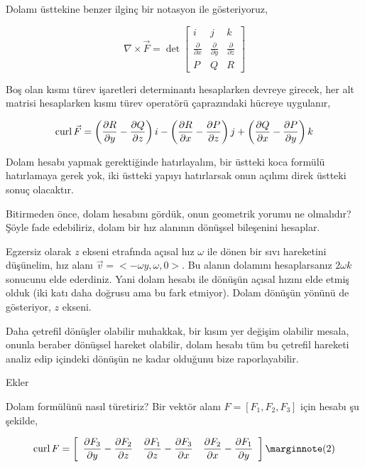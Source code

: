 \documentclass[12pt,fleqn]{article}\usepackage{../../common}
\begin{document}
Dolamı üsttekine benzer ilginç bir notasyon ile gösteriyoruz,

$$
\nabla \times \vec{F} =
\det
\left[\begin{array}{ccc}
i & j & k \\
\frac{\partial }{\partial x} & \frac{\partial }{\partial y} & \frac{\partial }{\partial z} \\
P & Q & R
\end{array}\right]
$$

Boş olan kısmı türev işaretleri determinantı hesaplarken devreye girecek, her
alt matrisi hesaplarken kısmı türev operatörü çaprazındaki hücreye uygulanır,

$$
\operatorname{curl} \vec{F} =
  \left(\frac{\partial R}{\partial y} - \frac{\partial Q}{\partial z}\right) i -
  \left(\frac{\partial R}{\partial x} - \frac{\partial P}{\partial z}\right) j +
  \left(\frac{\partial Q}{\partial x} - \frac{\partial P}{\partial y}\right) k   
$$

Dolam hesabı yapmak gerektiğinde hatırlayalım, bir üstteki koca formülü
hatırlamaya gerek yok, iki üstteki yapıyı hatırlarsak onun açılımı direk
üstteki sonuç olacaktır.

Bitirmeden önce, dolam hesabını gördük, onun geometrik yorumu ne olmalıdır?
Şöyle fade edebiliriz, dolam bir hız alanının dönüşsel bileşenini hesaplar.

Egzersiz olarak $z$ ekseni etrafında açısal hız $\omega$ ile dönen bir sıvı
hareketini düşünelim, hız alanı $\vec{v} = < -\omega y, \omega, 0 > $.  Bu
alanın dolamını hesaplarsanız $2 \omega k$ sonucunu elde ederdiniz.  Yani dolam
hesabı ile dönüşün açısal hızını elde etmiş olduk (iki katı daha doğrusu ama bu
fark etmiyor). Dolam dönüşün yönünü de gösteriyor, $z$ ekseni.

Daha çetrefil dönüşler olabilir muhakkak, bir kısım yer değişim olabilir mesala,
onunla beraber dönüşsel hareket olabilir, dolam hesabı tüm bu çetrefil hareketi
analiz edip içindeki dönüşün ne kadar olduğunu bize raporlayabilir.

Ekler

Dolam formülünü nasıl türetiriz? Bir vektör alanı $F = [F_1,F_2,F_3]$ için
hesabı şu şekilde,

$$
\curl F = \left[\begin{array}{ccc} 
\dfrac{\partial F_3}{\partial y} - \dfrac{\partial F_2}{\partial z} & 
\dfrac{\partial F_1}{\partial z} - \dfrac{\partial F_3}{\partial x} & 
\dfrac{\partial F_2}{\partial x} - \dfrac{\partial F_1}{\partial y} 
\end{array}\right]
\mlabel{2}
$$
\end{document}
